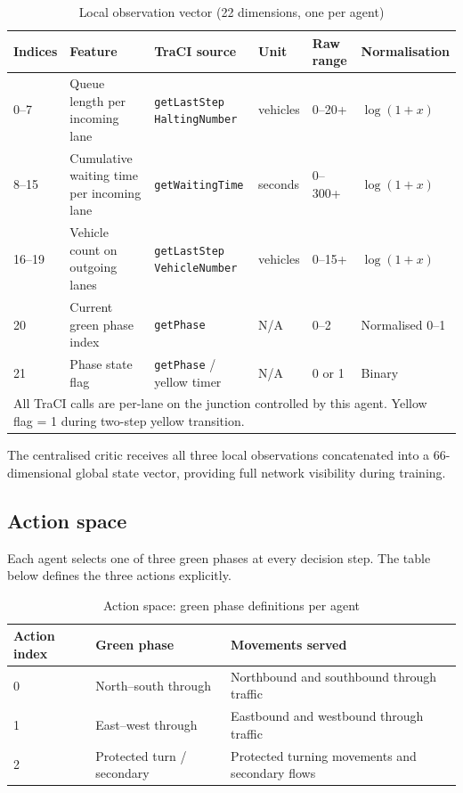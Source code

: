 ﻿\documentclass[11pt, a4paper]{report}
\begin{document}
\begin{table}[H]
\centering
\caption{Local observation vector (22 dimensions, one per agent)}
\label{tab:obs_space}
\small
\setlength{\tabcolsep}{3pt}
\begin{tabular}{@{}p{1.2cm}p{3.0cm}p{2.6cm}p{1.2cm}p{1.6cm}p{2.1cm}@{}}
\toprule
\textbf{Indices} & \textbf{Feature} & \textbf{TraCI source} & \textbf{Unit} & \textbf{Raw range} & \textbf{Normalisation} \\
\midrule
0--7   & Queue length per incoming lane & \shortstack[l]{\texttt{getLastStep}\\\texttt{HaltingNumber}} & vehicles & 0--20+ & $\log(1+x)$ \\
8--15  & Cumulative waiting time per incoming lane & \texttt{getWaitingTime} & seconds & 0--300+ & $\log(1+x)$ \\
16--19 & Vehicle count on outgoing lanes & \shortstack[l]{\texttt{getLastStep}\\\texttt{VehicleNumber}} & vehicles & 0--15+ & $\log(1+x)$ \\
20     & Current green phase index & \texttt{getPhase} & N/A & 0--2 & Normalised 0--1 \\
21     & Phase state flag & \texttt{getPhase} / yellow timer & N/A & 0 or 1 & Binary \\
\bottomrule
\multicolumn{6}{l}{\footnotesize All TraCI calls are per-lane on the junction controlled by this agent. Yellow flag = 1 during two-step yellow transition.}
\end{tabular}
\end{table}

The centralised critic receives all three local observations concatenated into a 66-dimensional global state vector, providing full network visibility during training.

\subsection{Action space}

Each agent selects one of three green phases at every decision step. The table below defines the three actions explicitly.

\begin{table}[H]
\centering
\caption{Action space: green phase definitions per agent}
\label{tab:action_space}
\begin{tabular}{lll}
\toprule
\textbf{Action index} & \textbf{Green phase} & \textbf{Movements served} \\
\midrule
0 & North--south through & Northbound and southbound through traffic \\
1 & East--west through & Eastbound and westbound through traffic \\
2 & Protected turn / secondary & Protected turning movements and secondary flows \\
\bottomrule
\end{tabular}
\end{table}
\end{document}
